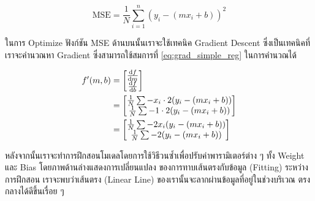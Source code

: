 \begin{equation}
    \text{MSE} = \frac{1}{N} \sum_{i=1}^{n} (y_i - (m x_i + b))^2
\end{equation}

ในการ Optimize ฟังก์ชัน MSE ด้านบนนั้นเราจะใช้เทคนิค Gradient Descent ซึ่งเป็นเทคนิคที่เราจะคำนวณหา Gradient ซึ่งสามารถใช้สมการที่
\eqref{eq:grad_simple_reg} ในการคำนวณได้

\begin{align}\label{eq:grad_simple_reg}
    f'(m,b) & =
    \begin{bmatrix}
        \dv{f}{m} \\
        \dv{f}{b} \\
    \end{bmatrix}                                  \\
            & =
    \begin{bmatrix}
        \frac{1}{N} \sum -x_i \cdot 2(y_i - (mx_i + b)) \\
        \frac{1}{N} \sum -1 \cdot 2(y_i - (mx_i + b))   \\
    \end{bmatrix} \\
            & =
    \begin{bmatrix}
        \frac{1}{N} \sum -2x_i(y_i - (mx_i + b)) \\
        \frac{1}{N} \sum -2(y_i - (mx_i + b))    \\
    \end{bmatrix}
\end{align}

หลังจากนั้นเราจะทำการฝึกสอนโมเดลโดยการใช้วิธีวนซ้ำเพื่อปรับค่าพารามิเตอร์ต่าง ๆ ทั้ง Weight และ Bias โดยภาพด้านล่างแสดงการเปลี่ยนแปลง%
ของการทาบเส้นตรงกับข้อมูล (Fitting) ระหว่างการฝึกสอน เราจะพบว่าเส้นตรง (Linear Line) ของเรานั้นจะลากผ่านข้อมูลที่อยู่ในช่วงบริเวณ%
ตรงกลางได้ดีขึ้นเรื่อย ๆ


